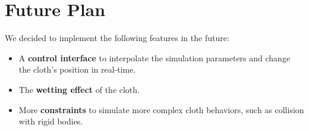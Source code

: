 \section{Future Plan}

We decided to implement the following features in the future:

\begin{itemize}
\item A \textbf{control interface} to interpolate the simulation parameters and change the cloth's position in real-time.
\item The \textbf{wetting effect} of the cloth.
\item More \textbf{constraints} to simulate more complex cloth behaviors, such as collision with rigid bodies.
\end{itemize}


